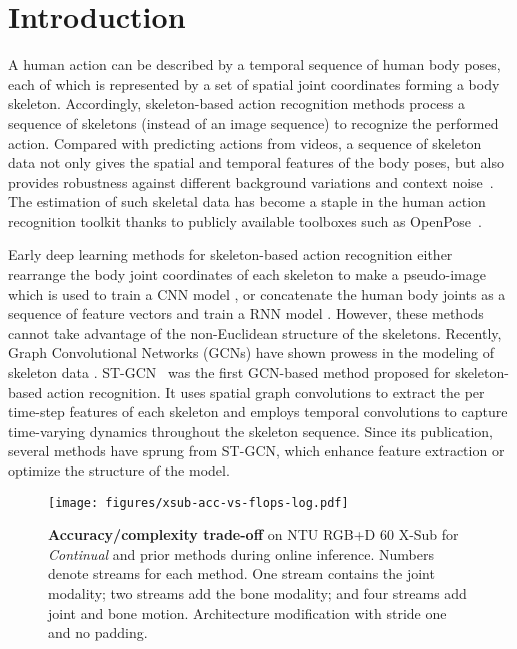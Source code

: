 \documentclass[journal]{IEEEtran}
\theoremstyle{definition}
\begin{document}
\maketitle


\section{Introduction}\label{sec:introduction}

A human action can be described by a temporal sequence of human body poses, each of which is represented by a set of spatial joint coordinates forming a body skeleton.
Accordingly, skeleton-based action recognition methods process a sequence of skeletons (instead of an image sequence) to recognize the performed action.  
Compared with predicting actions from videos, a sequence of skeleton data not only gives the spatial and temporal features of the body poses, but also provides robustness against different background variations and context noise~\cite{han2017space}. 
The estimation of such skeletal data has become a staple in the human action recognition toolkit thanks to publicly available toolboxes such as OpenPose~\cite{cao2019openpose}. 


Early deep learning methods for skeleton-based action recognition either rearrange the body joint coordinates of each skeleton to make a pseudo-image which is used to train a CNN model \cite{kim2017interpretable,liu2017enhanced,naveenkumar2020deep}, or concatenate the human body joints as a sequence of feature vectors and train a RNN model \cite{liu2016spatio,zhang2017view, nikpour2023spatio}. 
However, these methods cannot take advantage of the non-Euclidean structure of the skeletons.
Recently, Graph Convolutional Networks (GCNs) have shown prowess in the modeling of skeleton data \cite{heidari2022gcnChapter}. 
ST-GCN~\cite{yan2018spatial} was the first GCN-based method proposed for skeleton-based action recognition. It uses spatial graph convolutions to extract the per time-step features of each skeleton and employs temporal convolutions to capture time-varying dynamics throughout the skeleton sequence. 
Since its publication, several methods have sprung from ST-GCN, which enhance feature extraction or optimize the structure of the model.  


\begin{figure}[t]
    \centering
    \texttt{[image: figures/xsub-acc-vs-flops-log.pdf]}
    \caption{
        \textbf{Accuracy/complexity trade-off} on NTU RGB+D 60 X-Sub for  \textit{Continual} and  prior methods during online inference.
        Numbers denote streams for each method.
        One stream contains the joint modality; two streams add the bone modality; and four streams add joint and bone motion.
        Architecture modification with stride one and no padding.
    }
    \label{fig:test-acc-vs-flops}
\end{figure}
\end{document}
